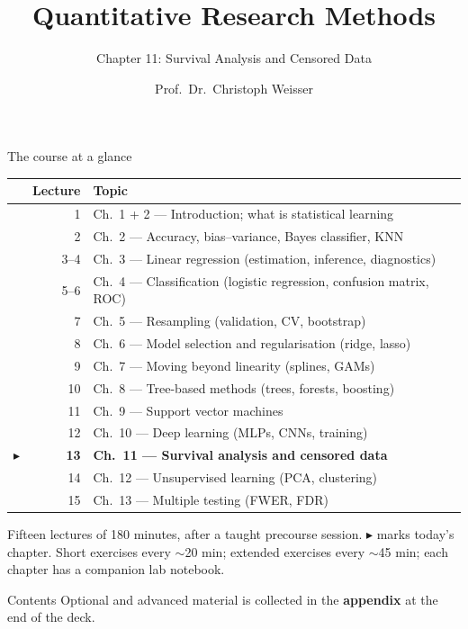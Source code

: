 \documentclass[aspectratio=169,11pt]{beamer}
\title{Quantitative Research Methods}
\subtitle{Chapter 11: Survival Analysis and Censored Data}
\author{Prof.\ Dr.\ Christoph Weisser}\institute{HSBI}
\date{}\graphicspath{{images/}}
\begin{document}
\begin{frame}[plain]\titlepage\end{frame}

\begin{frame}{The course at a glance}
  \footnotesize
  \begin{center}
  \begin{tabular}{@{}c r l@{}}
    & \textbf{Lecture} & \textbf{Topic}\\
    \midrule
     & 1 & Ch.\ 1 + 2 --- Introduction; what is statistical learning \\
     & 2 & Ch.\ 2 --- Accuracy, bias--variance, Bayes classifier, KNN \\
     & 3--4 & Ch.\ 3 --- Linear regression (estimation, inference, diagnostics) \\
     & 5--6 & Ch.\ 4 --- Classification (logistic regression, confusion matrix, ROC) \\
     & 7 & Ch.\ 5 --- Resampling (validation, CV, bootstrap) \\
     & 8 & Ch.\ 6 --- Model selection and regularisation (ridge, lasso) \\
     & 9 & Ch.\ 7 --- Moving beyond linearity (splines, GAMs) \\
     & 10 & Ch.\ 8 --- Tree-based methods (trees, forests, boosting) \\
     & 11 & Ch.\ 9 --- Support vector machines \\
     & 12 & Ch.\ 10 --- Deep learning (MLPs, CNNs, training) \\
    $\blacktriangleright$ & \textbf{13} & \textbf{Ch.\ 11 --- Survival analysis and censored data} \\
     & 14 & Ch.\ 12 --- Unsupervised learning (PCA, clustering) \\
     & 15 & Ch.\ 13 --- Multiple testing (FWER, FDR) \\
  \end{tabular}
  \end{center}
  \vspace{2pt}
  {\scriptsize Fifteen lectures of 180 minutes, after a taught precourse session. $\blacktriangleright$ marks today's chapter. Short exercises every $\sim$20 min; extended exercises every $\sim$45 min; each chapter has a companion lab notebook.}
\end{frame}

\begin{frame}{Contents}\small\tableofcontents[hideallsubsections]
  \vfill
  {\tiny Optional and advanced material is collected in the \textbf{appendix} at the end of the deck.}
\end{frame}
\end{document}
